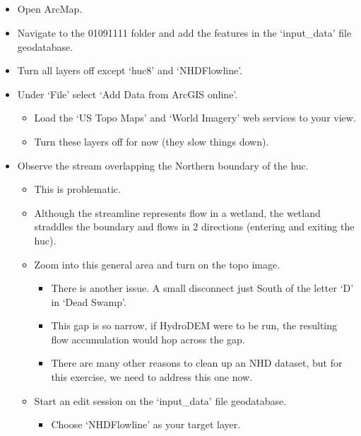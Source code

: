 \documentclass[letterpaper,10pt,english]{sphinxmanual}
\begin{document}
\subparagraph{}
\label{\detokenize{ex_1:exercise-instructions}}\begin{itemize}
\item {} 
Open ArcMap.

\item {} 
Navigate to the 01091111 folder and add the features in the ‘input\_data’ file geodatabase.

\item {} 
Turn all layers off except ‘huc8’ and ‘NHDFlowline’.

\item {} 
Under ‘File’ select ‘Add Data from ArcGIS online’.
\begin{itemize}
\item {} 
Load the ‘US Topo Maps’ and ‘World Imagery’ web services to your view.

\item {} 
Turn these layers off for now (they slow things down).

\end{itemize}

\item {} 
Observe the stream overlapping the Northern boundary of the huc.
\begin{itemize}
\item {} 
This is problematic.

\item {} 
Although the streamline represents flow in a wetland, the wetland straddles the boundary and flows in 2 directions (entering and exiting the huc).

\item {} 
Zoom into this general area and turn on the topo image.
\begin{itemize}
\item {} 
There is another issue. A small disconnect just South of the letter ‘D’ in ‘Dead Swamp’.

\item {} 
This gap is so narrow, if HydroDEM were to be run, the resulting flow accumulation would hop across the gap.

\item {} 
There are many other reasons to clean up an NHD dataset, but for this exercise, we need to address this one now.

\end{itemize}

\item {} 
Start an edit session on the ‘input\_data’ file geodatabase.
\begin{itemize}
\item {} 
Choose ‘NHDFlowline’ as your target layer.


\end{itemize}
\end{itemize}
\end{itemize}
\end{document}

